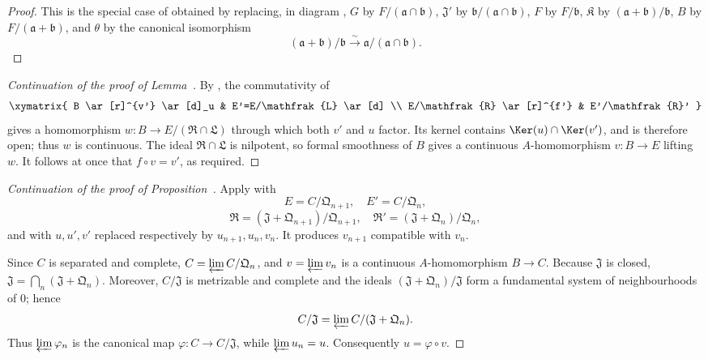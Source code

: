 \begin{proof}
This is the special case of  obtained by replacing, in diagram , $G$ by $F/(\mathfrak{a}\cap\mathfrak{b})$, $\mathfrak{J}'$ by $\mathfrak{b}/(\mathfrak{a}\cap\mathfrak{b})$, $F$ by $F/\mathfrak{b}$, $\mathfrak{K}$ by $(\mathfrak{a}+\mathfrak{b})/\mathfrak{b}$, $B$ by $F/(\mathfrak{a}+\mathfrak{b})$, and $\theta$ by the canonical isomorphism
\[
  (\mathfrak{a}+\mathfrak{b})/\mathfrak{b}\xrightarrow{\sim}\mathfrak{a}/(\mathfrak{a}\cap\mathfrak{b}).
\]
\end{proof}

\begin{proof}[Continuation of the proof of Lemma~{\rm{}}]
By , the commutativity of
\[
\xymatrix{
  B \ar[r]^{v'} \ar[d]_u & E'=E/\mathfrak{L} \ar[d] \\
  E/\mathfrak{R} \ar[r]^{f'} & E'/\mathfrak{R}'
}
\]
gives a homomorphism $w:B\to E/(\mathfrak{R}\cap\mathfrak{L})$ through which both $v'$ and $u$ factor.
Its kernel contains $\Ker(u)\cap\Ker(v')$, and is therefore open; thus $w$ is continuous.
The ideal $\mathfrak{R}\cap\mathfrak{L}$ is nilpotent, so formal smoothness of $B$ gives a continuous $A$-homomorphism $v:B\to E$ lifting $w$.
It follows at once that $f\circ v=v'$, as required.
\end{proof}

\begin{proof}[Continuation of the proof of Proposition~{\rm{}}]
Apply  with
\[
  E=C/\mathfrak{Q}_{n+1},\quad E'=C/\mathfrak{Q}_n,
\]
\[
  \mathfrak{R}=(\mathfrak{J}+\mathfrak{Q}_{n+1})/\mathfrak{Q}_{n+1},\quad
  \mathfrak{R}'=(\mathfrak{J}+\mathfrak{Q}_n)/\mathfrak{Q}_n,
\]
and with $u,u',v'$ replaced respectively by $u_{n+1},u_n,v_n$.
It produces $v_{n+1}$ compatible with $v_n$.

Since $C$ is separated and complete, $C=\varprojlim C/\mathfrak{Q}_n$, and $v=\varprojlim v_n$ is a continuous $A$-homomorphism $B\to C$.
Because $\mathfrak{J}$ is closed, $\mathfrak{J}=\bigcap_n(\mathfrak{J}+\mathfrak{Q}_n)$.
Moreover, $C/\mathfrak{J}$ is metrizable and complete and the ideals $(\mathfrak{J}+\mathfrak{Q}_n)/\mathfrak{J}$ form a fundamental system of neighbourhoods of $0$; hence
\[
  C/\mathfrak{J}=\varprojlim C/(\mathfrak{J}+\mathfrak{Q}_n).
\]
Thus $\varprojlim\varphi_n$ is the canonical map $\varphi:C\to C/\mathfrak{J}$, while $\varprojlim u_n=u$.
Consequently $u=\varphi\circ v$.
\end{proof}

